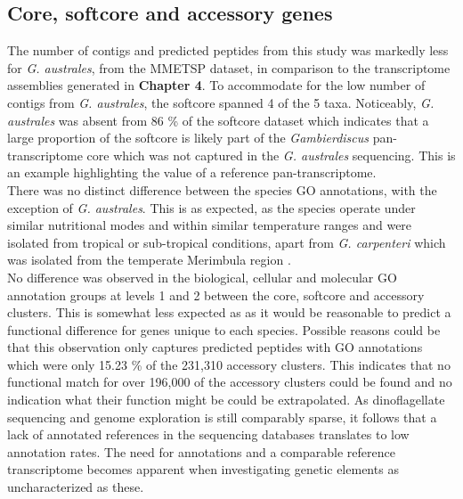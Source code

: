 \documentclass[12pt]{article}
\begin{document}
\subsection{Core, softcore and accessory genes}
The number of contigs and predicted peptides from this study was markedly less for \textit{G. australes}, from the MMETSP dataset, in comparison to the transcriptome assemblies generated in \textbf{Chapter 4}. 
To accommodate for the low number of contigs from \textit{G. australes}, the softcore spanned 4 of the 5 taxa. 
Noticeably, \textit{G. australes} was absent from 86 \% of the softcore dataset which indicates that a large proportion of the softcore is likely part of the \textit{Gambierdiscus} pan-transcriptome core which was not captured in the \textit{G. australes} sequencing. 
This is an example highlighting the value of a reference pan-transcriptome.\\
There was no distinct difference between the species GO annotations, with the exception of \textit{G. australes}. 
This is as expected, as the species operate under similar nutritional modes and within similar temperature ranges \cite{kibler2012growth,parsons2012gambierdiscus} and were isolated from tropical or sub-tropical conditions, apart from \textit{G. carpenteri} which was isolated from the temperate Merimbula region \cite{larsson2018toxicology}. \\
No difference was observed in the biological, cellular and molecular GO annotation groups at levels 1 and 2 between the core, softcore and accessory clusters. 
This is somewhat less expected as as it would be reasonable to predict a functional difference for genes unique to each species. 
Possible reasons could be that this observation only captures predicted peptides with GO annotations which were only 15.23 \% of the 231,310 accessory clusters. 
This indicates that no functional match for over 196,000 of the accessory clusters could be found and no indication what their function might be could be extrapolated. 
As dinoflagellate sequencing and genome exploration is still comparably sparse, it follows that a lack of annotated references in the sequencing databases translates to low annotation rates.
The need for annotations and a comparable reference transcriptome becomes apparent when investigating genetic elements as uncharacterized as these.
\end{document}
